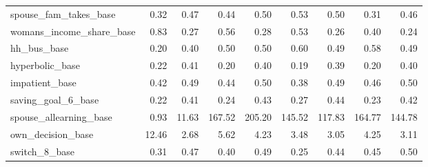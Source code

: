 \begin{tabular}{lrrrrrrrr}
spouse\_fam\_takes\_base & 0.32 & 0.47 & 0.44 & 0.50 & 0.53 & 0.50 & 0.31 & 0.46\\
\addlinespace
womans\_income\_share\_base & 0.83 & 0.27 & 0.56 & 0.28 & 0.53 & 0.26 & 0.40 & 0.24\\
hh\_bus\_base & 0.20 & 0.40 & 0.50 & 0.50 & 0.60 & 0.49 & 0.58 & 0.49\\
hyperbolic\_base & 0.22 & 0.41 & 0.20 & 0.40 & 0.19 & 0.39 & 0.20 & 0.40\\
impatient\_base & 0.42 & 0.49 & 0.44 & 0.50 & 0.38 & 0.49 & 0.46 & 0.50\\
saving\_goal\_6\_base & 0.22 & 0.41 & 0.24 & 0.43 & 0.27 & 0.44 & 0.23 & 0.42\\
\addlinespace
spouse\_allearning\_base & 0.93 & 11.63 & 167.52 & 205.20 & 145.52 & 117.83 & 164.77 & 144.78\\
own\_decision\_base & 12.46 & 2.68 & 5.62 & 4.23 & 3.48 & 3.05 & 4.25 & 3.11\\
switch\_8\_base & 0.31 & 0.47 & 0.40 & 0.49 & 0.25 & 0.44 & 0.45 & 0.50\\
\bottomrule
\end{tabular}
